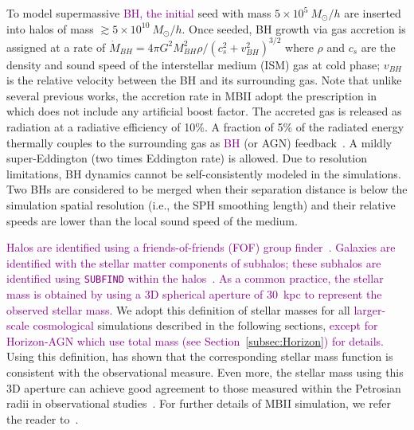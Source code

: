 \documentclass[twocolumn]{aastex631}
\newcommand{\red}[1]{\textcolor{purple}{#1}}
\begin{document}
To model supermassive \red{BH, the initial} seed with mass $5\times 10^{5}~M_{\odot}/h$ are inserted into halos of mass $\gtrsim 5\times 10^{10}~M_{\odot}/h$. Once seeded, BH growth via gas accretion is assigned at a rate of $\dot{M}_{BH}={4\pi G^2 M_{BH}^2 \rho}/{(c_s^2+v_{BH}^2)^{3/2}}$ where $\rho$ and $c_s$ are the density and sound speed of the interstellar medium (ISM) gas at cold phase; $v_{BH}$ is the relative velocity between the BH and its surrounding gas. Note that unlike several previous works, the accretion rate in MBII adopt the prescription in~\citet{Pelupessy2007} which does not include any artificial boost factor. The accreted gas is released as radiation at a radiative efficiency of 10\%. A fraction of 5\% of the radiated energy thermally couples to the surrounding gas as \red{BH} (or AGN) feedback~\citep{2005Natur.433..604D}. A mildly super-Eddington (two times Eddington rate) is allowed. Due to resolution limitations, BH dynamics cannot be self-consistently modeled in the simulations. Two BHs are considered to be merged when their separation distance is below the simulation spatial resolution (i.e., the SPH smoothing length) and their relative speeds are lower than the local sound speed of the medium.

\red{Halos are identified using a friends-of-friends (FOF) group finder~\citep{1985ApJ...292..371D}. Galaxies are identified with the stellar matter components of subhalos; these subhalos are identified using {\tt SUBFIND} within the halos~\citep{2005MNRAS.364.1105S}. As a common practice, the stellar mass is obtained by using a 3D spherical aperture of 30~kpc to represent the observed stellar mass.}
We adopt this definition of stellar masses for all \red{larger-scale cosmological} simulations described in the following sections, \red{except for Horizon-AGN which use total mass (see Section~\ref{subsec:Horizon}) for details.}  Using this definition, \citet{Pillepich2018} has shown that the corresponding stellar mass function is consistent with the observational measure. Even more, the stellar mass using this 3D aperture can achieve good agreement to those measured within the Petrosian radii in observational studies~\citep{Schaye2015}. For further details of MBII simulation, we refer the reader to~\citet{Khandai2015}.
\end{document}
